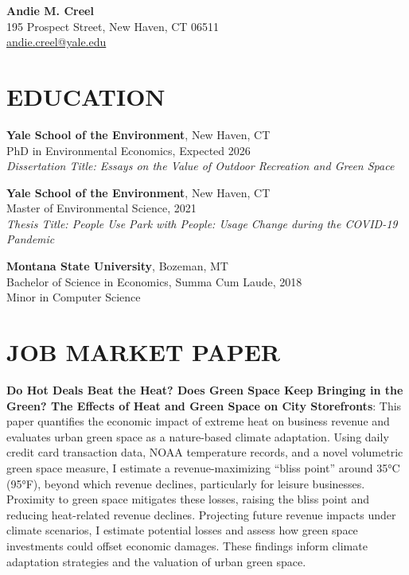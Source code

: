 \documentclass[11pt]{article}
\begin{document}
\begin{center}
    \textbf{\Huge Andie M. Creel} \\
    195 Prospect Street, New Haven, CT 06511 \\
    \href{mailto:andie.creel@yale.edu}{andie.creel@yale.edu}
\end{center}

\section*{EDUCATION}
\textbf{Yale School of the Environment}, New Haven, CT \\
PhD in Environmental Economics, Expected 2026 \\
\textit{Dissertation Title: Essays on the Value of Outdoor Recreation and Green Space}


\textbf{Yale School of the Environment}, New Haven, CT \\
Master of Environmental Science, 2021 \\
\textit{Thesis Title: People Use Park with People: Usage Change during the COVID-19 Pandemic}

\textbf{Montana State University}, Bozeman, MT \\
Bachelor of Science in Economics, Summa Cum Laude, 2018 \\
Minor in Computer Science

\section*{JOB MARKET PAPER}
\textbf{Do Hot Deals Beat the Heat? Does Green Space Keep Bringing in the Green? The Effects of Heat and Green Space on City Storefronts}: This paper quantifies the economic impact of extreme heat on business revenue and evaluates urban green space as a nature-based climate adaptation. Using daily credit card transaction data, NOAA temperature records, and a novel volumetric green space measure, I estimate a revenue-maximizing “bliss point” around 35°C (95°F), beyond which revenue declines, particularly for leisure businesses. Proximity to green space mitigates these losses, raising the bliss point and reducing heat-related revenue declines. Projecting future revenue impacts under climate scenarios, I estimate potential losses and assess how green space investments could offset economic damages. These findings inform climate adaptation strategies and the valuation of urban green space.
\end{document}
